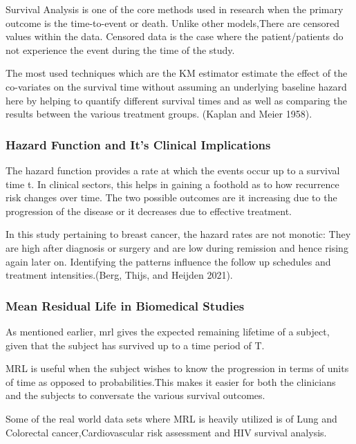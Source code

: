 \documentclass{article}
\begin{document}
Survival Analysis is one of the core methods used in research when the primary outcome is the time-to-event or death. Unlike other models,There are censored values within the data. Censored data is the case where the patient/patients do not experience the event during the time of the study.

The most used techniques which are the KM estimator estimate the effect of the co-variates on the survival time without assuming an underlying baseline hazard here by helping to quantify different survival times and as well as comparing the results between the various treatment groups. (Kaplan and Meier 1958).

\subsubsection{Hazard Function and It's Clinical Implications}\label{hazard-function-and-its-clinical-implications}

The hazard function provides a rate at which the events occur up to a survival time t. In clinical sectors, this helps in gaining a foothold as to how recurrence risk changes over time. The two possible outcomes are it increasing due to the progression of the disease or it decreases due to effective treatment.

In this study pertaining to breast cancer, the hazard rates are not monotic: They are high after diagnosis or surgery and are low during remission and hence rising again later on. Identifying the patterns influence the follow up schedules and treatment intensities.(Berg, Thijs, and Heijden 2021).

\subsubsection{Mean Residual Life in Biomedical Studies}\label{mean-residual-life-in-biomedical-studies}

As mentioned earlier, mrl gives the expected remaining lifetime of a subject, given that the subject has survived up to a time period of T.

MRL is useful when the subject wishes to know the progression in terms of units of time as opposed to probabilities.This makes it easier for both the clinicians and the subjects to conversate the various survival outcomes.

Some of the real world data sets where MRL is heavily utilized is of Lung and Colorectal cancer,Cardiovascular risk assessment and HIV survival analysis.
\end{document}
